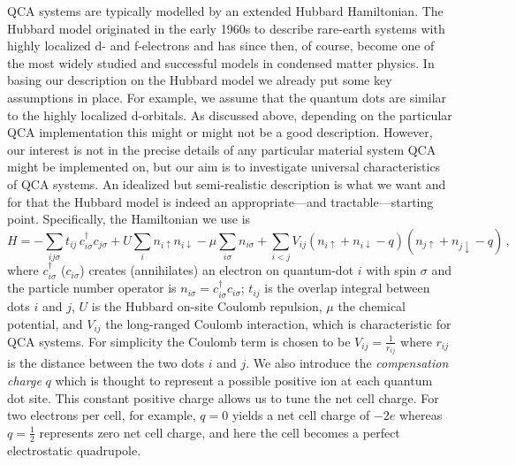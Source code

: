 QCA systems are typically modelled by an extended Hubbard Hamiltonian. The
Hubbard model originated in the early 1960s to describe rare-earth systems with
highly localized d- and f-electrons and has since then, of course, become one of
the most widely studied and successful models in condensed matter physics. In
basing our description on the Hubbard model we already put some key assumptions
in place. For example, we assume that the quantum dots are similar to the highly
localized d-orbitals. As discussed above, depending on the particular QCA
implementation this might or might not be a good description. However, our
interest is not in the precise details of any particular material system QCA
might be implemented on, but our aim is to investigate universal characteristics
of QCA systems. An idealized but semi-realistic description is what we want and
for that the Hubbard model is indeed an appropriate---and tractable---starting
point. Specifically, the Hamiltonian we use is
\begin{equation}
  \label{eq:H_QCA}
  H =
    - \sum_{ij\sigma} t_{ij} \, c^{\dagger}_{i\sigma} c_{j\sigma}
    + U \sum_i n_{i\uparrow} n_{i\downarrow}
    - \mu \sum_{i\sigma} n_{i\sigma}
    + \sum_{i<j} V_{ij} \left( n_{i\uparrow} + n_{i\downarrow} - q \right) 
                        \left( n_{j\uparrow} + n_{j\downarrow} - q \right) \, ,
\end{equation}
where $c^{\dagger}_{i\sigma}$ ($c_{i\sigma}$) creates (annihilates) an electron
on quantum-dot $i$ with spin $\sigma$ and the particle number operator is
$n_{i\sigma} = c^{\dagger}_{i\sigma} c_{i\sigma}$; $t_{ij}$ is the overlap integral between
dots $i$ and $j$, $U$ is the Hubbard on-site Coulomb repulsion, $\mu$ the
chemical potential, and $V_{ij}$ the long-ranged Coulomb interaction, which is
characteristic for QCA systems. For simplicity the Coulomb term is chosen to be
$V_{ij} = \frac{1}{r_{ij}}$ where $r_{ij}$ is the distance between the two dots
$i$ and $j$. We also introduce the \emph{compensation charge} $q$ which is
thought to represent a possible positive ion at each quantum dot site. This
constant positive charge allows us to tune the net cell charge. For two
electrons per cell, for example, $q=0$ yields a net cell charge of $-2e$ whereas
$q = \frac{1}{2}$ represents zero net cell charge, and here the cell becomes a
perfect electrostatic quadrupole.

